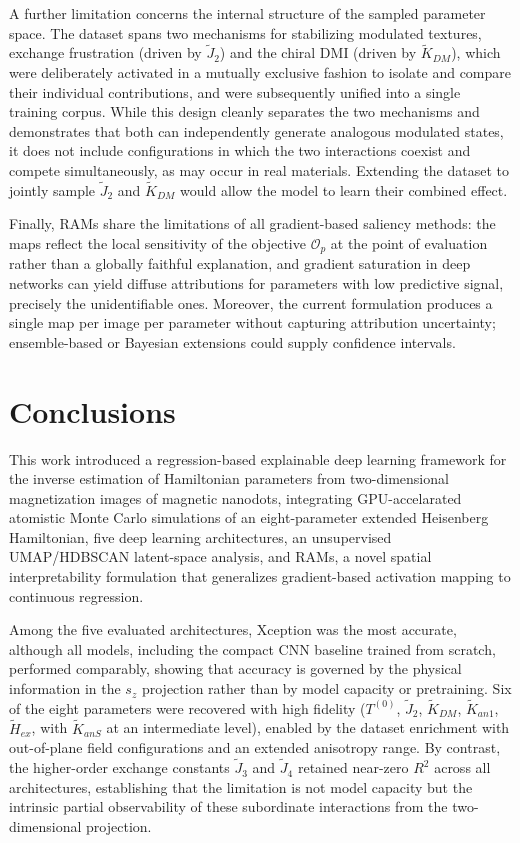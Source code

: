 \documentclass[final,5p,times,twocolumn]{elsarticle}
\begin{document}
A further limitation concerns the internal structure of the sampled parameter space. The dataset spans two mechanisms for stabilizing modulated textures, exchange frustration (driven by $\tilde{J}_2$) and the chiral DMI (driven by $\tilde{K}_{DM}$), which were deliberately activated in a mutually exclusive fashion to isolate and compare their individual contributions, and were subsequently unified into a single training corpus. While this design cleanly separates the two mechanisms and demonstrates that both can independently generate analogous modulated states, it does not include configurations in which the two interactions coexist and compete simultaneously, as may occur in real materials. Extending the dataset to jointly sample $\tilde{J}_2$ and $\tilde{K}_{DM}$ would allow the model to learn their combined effect.

Finally, RAMs share the limitations of all gradient-based saliency
methods: the maps reflect the local sensitivity of the objective
$\mathcal{O}_p$ at the point of evaluation rather than a globally
faithful explanation, and gradient saturation in deep networks can
yield diffuse attributions for parameters with low predictive
signal, precisely the unidentifiable ones. Moreover, the current
formulation produces a single map per image per parameter without
capturing attribution uncertainty; ensemble-based or Bayesian
extensions could supply confidence intervals.

\section{Conclusions}
\label{sec:conclusions}

This work introduced a regression-based explainable deep learning
framework for the inverse estimation of Hamiltonian parameters from
two-dimensional magnetization images of magnetic nanodots, integrating GPU-accelarated atomistic Monte Carlo simulations of an eight-parameter extended Heisenberg Hamiltonian, five deep learning architectures, an
unsupervised UMAP/HDBSCAN latent-space analysis, and RAMs, a novel
spatial interpretability formulation that generalizes gradient-based
activation mapping to continuous regression.
 
Among the five evaluated architectures, Xception was the most accurate,
although all models, including the compact CNN baseline trained from
scratch, performed comparably, showing that accuracy is governed by
the physical information in the $s_z$ projection rather than by model
capacity or pretraining. Six of the eight parameters were recovered
with high fidelity ($T^{(0)}$, $\tilde{J}_2$, $\tilde{K}_{DM}$,
$\tilde{K}_{an1}$, $\tilde{H}_{ex}$, with $\tilde{K}_{anS}$ at an
intermediate level), enabled by the dataset enrichment with
out-of-plane field configurations and an extended anisotropy range. By
contrast, the higher-order exchange constants $\tilde{J}_3$ and
$\tilde{J}_4$ retained near-zero $R^2$ across all architectures,
establishing that the limitation is not model capacity but the
intrinsic partial observability of these subordinate interactions from
the two-dimensional projection.
\end{document}
